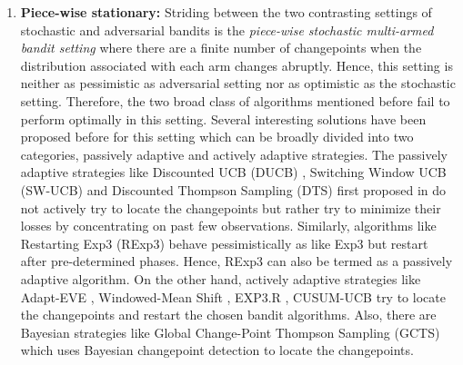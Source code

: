 \begin{enumerate}
\item \textbf{Piece-wise stationary:} Striding between the two contrasting settings of stochastic and adversarial bandits is the \textit{piece-wise stochastic multi-armed bandit setting} where there are a finite number of changepoints when the distribution associated with each arm changes abruptly. Hence, this setting is neither as pessimistic as adversarial setting nor as optimistic as the stochastic setting. Therefore, the two broad class of algorithms mentioned before fail to perform optimally in this setting. Several interesting solutions have been proposed before for this setting which can be broadly divided into two categories, passively adaptive and actively adaptive strategies. The passively adaptive strategies like Discounted UCB (DUCB) \citep{kocsis2006discounted}, Switching Window UCB (SW-UCB)  \citep{garivier2011upper} and Discounted Thompson Sampling (DTS) first proposed in \citet{raj2017taming} do not actively try to locate the changepoints but rather try to minimize their losses by concentrating on past few observations. Similarly, algorithms like Restarting Exp3 (RExp3) \citep{DBLP:journals/corr/BesbesGZ14} behave pessimistically as like Exp3 but restart after pre-determined phases. Hence, RExp3 can also be termed as a passively adaptive algorithm. On the other hand, actively adaptive strategies like Adapt-EVE \citep{hartland2007change}, Windowed-Mean Shift \citep{yu2009piecewise}, EXP3.R \citep{allesiardo2017non}, CUSUM-UCB \citep{liu2017change} try to locate the changepoints and restart the chosen bandit algorithms. Also, there are Bayesian strategies like Global Change-Point Thompson Sampling (GCTS)\citep{mellor2013thompson} which uses Bayesian changepoint detection to locate the changepoints. 


\end{enumerate}




